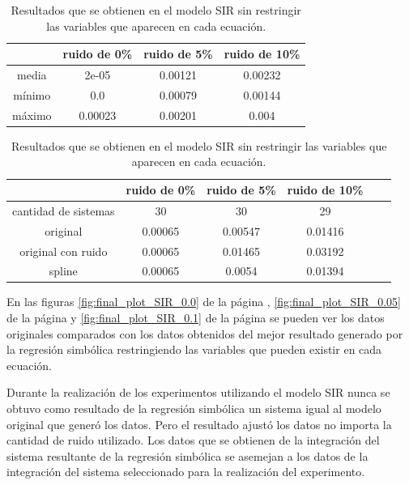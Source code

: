 \begin{table}[!h]
    \centering
    \caption{Resultados que se obtienen en el modelo SIR sin restringir las variables que aparecen en cada ecuación.}
    \begin{tabular}{|c|c|c|c|}
        \hline
               & \textbf{ruido de 0\%} & \textbf{ruido de 5\%} & \textbf{ruido de 10\%} \\
        \hline
        media  & 2e-05                 & 0.00121               & 0.00232                \\
        \hline
        mínimo & 0.0                   & 0.00079               & 0.00144                \\
        \hline
        máximo & 0.00023               & 0.00201               & 0.004                  \\
        \hline
    \end{tabular}

    \begin{tabular}{|c|c|c|c|c|c|}
        \hline
                             & \textbf{ruido de 0\%} & \textbf{ruido de 5\%} & \textbf{ruido de 10\%} \\
        \hline
        cantidad de sistemas & 30                    & 30                    & 29                     \\
        \hline
        original             & 0.00065               & 0.00547               & 0.01416                \\
        \hline
        original con ruido   & 0.00065               & 0.01465               & 0.03192                \\
        \hline
        spline               & 0.00065               & 0.0054                & 0.01394                \\
        \hline
    \end{tabular}
    \label{table:experiment_SIR_all}
\end{table}

En las figuras \ref{fig:final_plot_SIR_0.0} de la página \pageref{fig:final_plot_SIR_0.0}, \ref{fig:final_plot_SIR_0.05} de la página \pageref{fig:final_plot_SIR_0.05} y \ref{fig:final_plot_SIR_0.1} de la página \pageref{fig:final_plot_SIR_0.1} se pueden ver los datos originales comparados con los datos obtenidos del mejor resultado generado por la regresión simbólica restringiendo las variables que pueden existir en cada ecuación.

Durante la realización de los experimentos utilizando el modelo SIR nunca se obtuvo como resultado de la regresión simbólica un sistema igual al modelo original que generó los datos. Pero el resultado ajustó los datos no importa la cantidad de ruido utilizado. Los datos que se obtienen de la integración del sistema resultante de la regresión simbólica se asemejan a los datos de la integración del sistema seleccionado para la realización del experimento.

